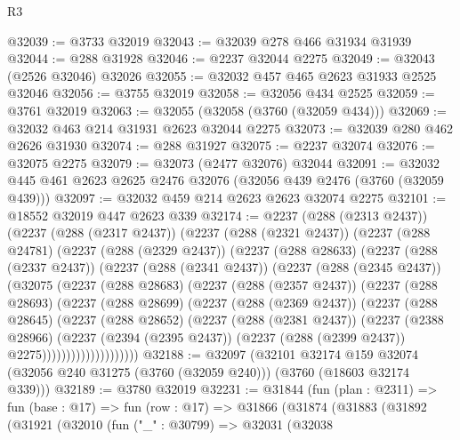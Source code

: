 \begin{lexlean}{R3}
\begin{coremodule}
@32039 := @3733 @32019
@32043 := @32039 @278 @466 @31934 @31939
@32044 := @288 @31928
@32046 := @2237 @32044 @2275
@32049 := @32043 (@2526 @32046) @32026
@32055 := @32032 @457 @465 @2623 @31933 @2525 @32046
@32056 := @3755 @32019
@32058 := @32056 @434 @2525
@32059 := @3761 @32019
@32063 := @32055 (@32058 (@3760 (@32059 @434)))
@32069 := @32032 @463 @214 @31931 @2623 @32044 @2275
@32073 := @32039 @280 @462 @2626 @31930
@32074 := @288 @31927
@32075 := @2237 @32074
@32076 := @32075 @2275
@32079 := @32073 (@2477 @32076) @32044
@32091 := @32032 @445 @461 @2623 @2625 @2476 @32076 (@32056 @439 @2476 (@3760 (@32059 @439)))
@32097 := @32032 @459 @214 @2623 @2623 @32074 @2275
@32101 := @18552 @32019 @447 @2623 @339
@32174 := @2237
    (@288 (@2313 @2437))
    (@2237
      (@288 (@2317 @2437))
      (@2237
        (@288 (@2321 @2437))
        (@2237
          (@288 @24781)
          (@2237
            (@288 (@2329 @2437))
            (@2237
              (@288 @28633)
              (@2237
                (@288 (@2337 @2437))
                (@2237
                  (@288 (@2341 @2437))
                  (@2237
                    (@288 (@2345 @2437))
                    (@32075
                      (@2237
                        (@288 @28683)
                        (@2237
                          (@288 (@2357 @2437))
                          (@2237
                            (@288 @28693)
                            (@2237
                              (@288 @28699)
                              (@2237
                                (@288 (@2369 @2437))
                                (@2237
                                  (@288 @28645)
                                  (@2237
                                    (@288 @28652)
                                    (@2237
                                      (@288 (@2381 @2437))
                                      (@2237
                                        (@2388 @28966)
                                        (@2237
                                          (@2394 (@2395 @2437))
                                          (@2237 (@288 (@2399 @2437)) @2275))))))))))))))))))))
@32188 := @32097
    (@32101
      @32174
      @159
      @32074
      (@32056 @240 @31275 (@3760 (@32059 @240)))
      (@3760 (@18603 @32174 @339)))
@32189 := @3780 @32019
@32231 := @31844
    (fun (plan : @2311) =>
    fun (base : @17) =>
    fun (row : @17) =>
    @31866
      (@31874
        (@31883
          (@31892
            (@31921
              (@32010
                (fun ("_" : @30799) =>
                @32031
                  (@32038

\end{coremodule}
\end{lexlean}
